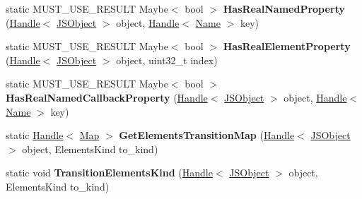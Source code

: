 \begin{DoxyCompactItemize}
\item 
\hypertarget{classv8_1_1internal_1_1_j_s_object_a66226a1997dd27147026a098075e6818}{}static M\+U\+S\+T\+\_\+\+U\+S\+E\+\_\+\+R\+E\+S\+U\+L\+T Maybe$<$ bool $>$ {\bfseries Has\+Real\+Named\+Property} (\hyperlink{classv8_1_1internal_1_1_handle}{Handle}$<$ \hyperlink{classv8_1_1internal_1_1_j_s_object}{J\+S\+Object} $>$ object, \hyperlink{classv8_1_1internal_1_1_handle}{Handle}$<$ \hyperlink{classv8_1_1internal_1_1_name}{Name} $>$ key)\label{classv8_1_1internal_1_1_j_s_object_a66226a1997dd27147026a098075e6818}

\item 
\hypertarget{classv8_1_1internal_1_1_j_s_object_a792d09543dde95abe7b8c1b8d555d9e5}{}static M\+U\+S\+T\+\_\+\+U\+S\+E\+\_\+\+R\+E\+S\+U\+L\+T Maybe$<$ bool $>$ {\bfseries Has\+Real\+Element\+Property} (\hyperlink{classv8_1_1internal_1_1_handle}{Handle}$<$ \hyperlink{classv8_1_1internal_1_1_j_s_object}{J\+S\+Object} $>$ object, uint32\+\_\+t index)\label{classv8_1_1internal_1_1_j_s_object_a792d09543dde95abe7b8c1b8d555d9e5}

\item 
\hypertarget{classv8_1_1internal_1_1_j_s_object_a2c2a243c0c3f7f3c162f3faa040ed2e6}{}static M\+U\+S\+T\+\_\+\+U\+S\+E\+\_\+\+R\+E\+S\+U\+L\+T Maybe$<$ bool $>$ {\bfseries Has\+Real\+Named\+Callback\+Property} (\hyperlink{classv8_1_1internal_1_1_handle}{Handle}$<$ \hyperlink{classv8_1_1internal_1_1_j_s_object}{J\+S\+Object} $>$ object, \hyperlink{classv8_1_1internal_1_1_handle}{Handle}$<$ \hyperlink{classv8_1_1internal_1_1_name}{Name} $>$ key)\label{classv8_1_1internal_1_1_j_s_object_a2c2a243c0c3f7f3c162f3faa040ed2e6}

\item 
\hypertarget{classv8_1_1internal_1_1_j_s_object_a97f098221e983f00c111222572171de4}{}static \hyperlink{classv8_1_1internal_1_1_handle}{Handle}$<$ \hyperlink{classv8_1_1internal_1_1_map}{Map} $>$ {\bfseries Get\+Elements\+Transition\+Map} (\hyperlink{classv8_1_1internal_1_1_handle}{Handle}$<$ \hyperlink{classv8_1_1internal_1_1_j_s_object}{J\+S\+Object} $>$ object, Elements\+Kind to\+\_\+kind)\label{classv8_1_1internal_1_1_j_s_object_a97f098221e983f00c111222572171de4}

\item 
\hypertarget{classv8_1_1internal_1_1_j_s_object_a62f3dbe23fd6c8eff78781d2a95cb8cb}{}static void {\bfseries Transition\+Elements\+Kind} (\hyperlink{classv8_1_1internal_1_1_handle}{Handle}$<$ \hyperlink{classv8_1_1internal_1_1_j_s_object}{J\+S\+Object} $>$ object, Elements\+Kind to\+\_\+kind)\label{classv8_1_1internal_1_1_j_s_object_a62f3dbe23fd6c8eff78781d2a95cb8cb}


\end{DoxyCompactItemize}
